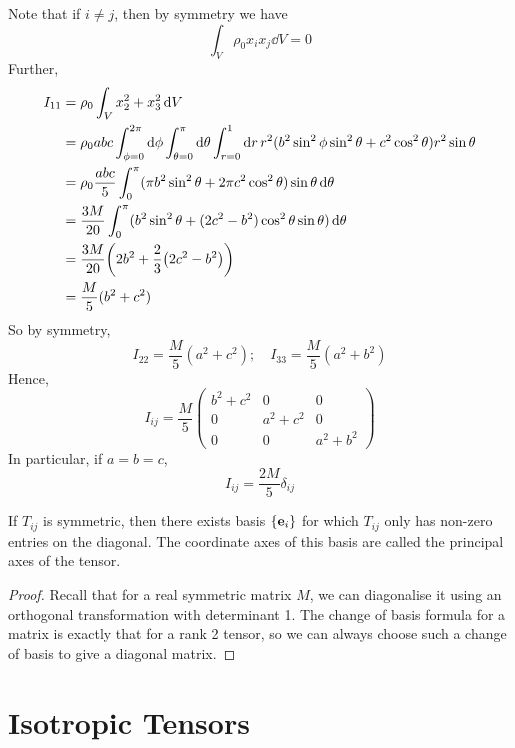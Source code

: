 \documentclass{article}
\begin{document}
Note that if $i \neq j$, then by symmetry we have
\[ \int_V \rho_0 x_i x_j \dd{V} = 0 \]
Further,
\begin{align*}
	I_{11} & = \rho_0 \int_V x_2^2 + x_3^2 \dd{V}                                                                                                                                  \\
	       & = \rho_0 abc \int_{\phi = 0}^{2\pi} \dd{\phi} \int_{\theta = 0}^\pi \dd{\theta} \int_{r = 0}^1 \dd{r} r^2 (b^2\sin^2\phi\sin^2\theta + c^2\cos^2\theta) r^2\sin\theta \\
	       & = \rho_0 \frac{abc}{5} \int_0^\pi (\pi b^2 \sin^2 \theta + 2\pi c^2\cos^2\theta) \sin\theta \dd{\theta}                                                               \\
	       & = \frac{3M}{20} \int_0^\pi (b^2 \sin^2 \theta + (2c^2 - b^2)\cos^2\theta\sin\theta) \dd{\theta}                                                                       \\
	       & = \frac{3M}{20} \qty(2b^2 + \frac{2}{3}\qty(2c^2 - b^2))                                                                                                              \\
	       & = \frac{M}{5} (b^2 + c^2)
\end{align*}
So by symmetry,
\[ I_{22} = \frac{M}{5} (a^2 + c^2);\quad I_{33} = \frac{M}{5} (a^2 + b^2) \]
Hence,
\[ I_{ij} = \frac{M}{5} \begin{pmatrix}
		b^2 + c^2 & 0         & 0         \\
		0         & a^2 + c^2 & 0         \\
		0         & 0         & a^2 + b^2
	\end{pmatrix} \]
In particular, if $a=b=c$,
\[ I_{ij} = \frac{2M}{5}\delta_{ij} \]
\begin{proposition}
	If $T_{ij}$ is symmetric, then there exists basis $\{ \vb e_i \}$ for which $T_{ij}$ only has non-zero entries on the diagonal. The coordinate axes of this basis are called the principal axes of the tensor.
\end{proposition}
\begin{proof}
	Recall that for a real symmetric matrix $M$, we can diagonalise it using an orthogonal transformation with determinant 1. The change of basis formula for a matrix is exactly that for a rank 2 tensor, so we can always choose such a change of basis to give a diagonal matrix.
\end{proof}

\section{Isotropic Tensors}
\end{document}
